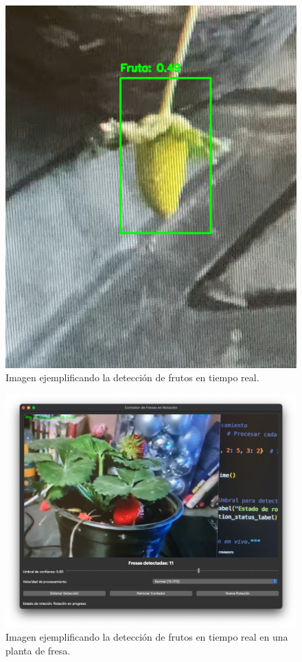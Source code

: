 \documentclass[conference]{IEEEtran}
\begin{document}
\begin{figure}[ht]
    \centering
    \includegraphics[width=\columnwidth]{images/detection4.png}
    \caption{Imagen ejemplificando la detección de frutos en tiempo real.}
    \label{fig:detection4}
\end{figure}

\begin{figure}[ht]
    \centering
    \includegraphics[width=\columnwidth]{images/real-dec1.png}
    \caption{Imagen ejemplificando la detección de frutos en tiempo real en una planta de fresa.}
    \label{fig:real-dec1}
\end{figure}
\end{document}
